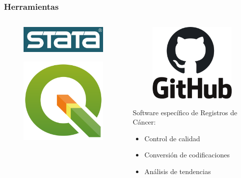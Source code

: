 \documentclass{beamer}
\begin{document}
\begin{frame}\frametitle{Herramientas}
	\begin{columns}
		\begin{column}{0.4\textwidth}
			\begin{figure}
				\centering
				\includegraphics[width=.7\textwidth]{images/stata.jpg}
			\end{figure}
			\vspace{15pt}	
			\begin{figure}
				\centering
				\includegraphics[width=.4\textwidth]{images/qgis.png}
			\end{figure}
		\end{column}
		\begin{column}{0.6\textwidth}
			\begin{figure}
				\centering
				\includegraphics[width=.4\textwidth]{logos/logo_github.png}
			\end{figure}
			\vspace{15pt}	
			\centering
			Software específico de Registros de Cáncer:\\
			\begin{itemize}
				\item 			\centering Control de calidad
				\item 			\centering Conversión de codificaciones
				\item 			\centering Análisis de tendencias
			\end{itemize}	
		\end{column}
	\end{columns}
\end{frame}
\end{document}
